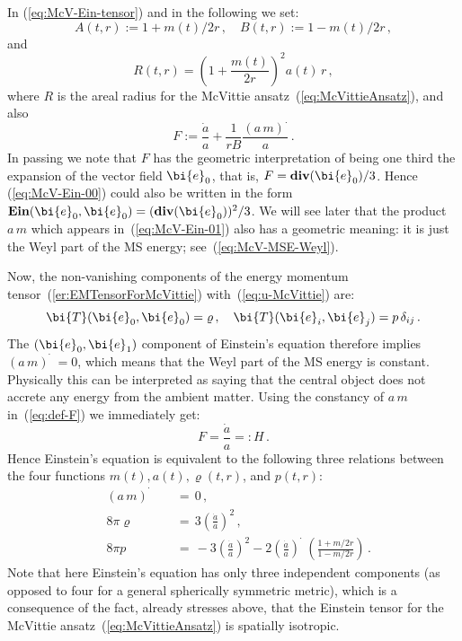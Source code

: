 \documentclass
[rmp,aps,twocolumn,showpacs,preprintnumbers,amsmath,amssymb]{revtex4}
\theoremstyle{plain}
\theoremstyle{definition}
\theoremstyle{remark}
\newcommand{\br}[1]{\mathbf{#1}}              %
\DeclareMathOperator{\Div}{\br{div}}          %
\DeclareMathOperator{\Ein}{\br{Ein}}          %
\newcommand{\bdot}{\boldsymbol{\cdot}}
\newcommand{\be}{\bi{e}}
\newcommand{\bT}{\bi{T}}
\begin{document}
In (\ref{eq:McV-Ein-tensor}) and in the following we set: 
%
\begin{equation}\label{eq:def-AB}
  A(t,r) := 1+m(t)/2r \,, \quad{  } B(t,r) := 1-m(t)/2r \,,
\end{equation}
%
and
%
\begin{equation}\label{eq:McVittieArealRadius}
  R(t,r)=\left( 1+\frac{m(t)}{2r} \right)^2 a(t)\,r \,,
\end{equation}
%
where $R$ is the areal radius for the McVittie 
ansatz~(\ref{eq:McVittieAnsatz}), and also
%
\begin{equation}\label{eq:def-F}
  F := \frac{\dot a}{a} + \frac{1}{rB}\frac{(a\,m)^{\bdot}}{a} \,.
\end{equation}
%
In passing we note that $F$ has the geometric interpretation of being 
one third the expansion of the vector field $\be_0$, that is, 
$F=\Div(\be_0)/3$. Hence (\ref{eq:McV-Ein-00}) could also be written 
in the form $\Ein(\be_0,\be_0)=(\Div(\be_0))^2/3$. We will see later 
that the product $a\,m$ which appears in~(\ref{eq:McV-Ein-01}) also 
has a geometric meaning: it is just the Weyl part of the MS energy; 
see~(\ref{eq:McV-MSE-Weyl}).

Now, the non-vanishing components of the energy momentum 
tensor~(\ref{er:EMTensorForMcVittie}) with~(\ref{eq:u-McVittie}) are:
%
\begin{equation}\label{eq:T-e0-components}
  \bT(\be_0,\be_0) = \varrho \,, \quad 
  \bT(\be_i,\be_j) = p\,\delta_{ij}\,. 
\end{equation}
%
The $(\be_0,\be_1)$ component of Einstein's equation therefore implies 
$(a\,m)\!\dot{\phantom{I}}\! = 0$, which means that the Weyl part of 
the MS energy is constant. Physically this can be interpreted as 
saying that the central object does not accrete any energy from 
the ambient matter. Using the constancy of $a\,m$ in~(\ref{eq:def-F}) 
we immediately get: 
%
\begin{equation}\label{eq:F-McVittie}
  F = \frac{\dot a}{a} =: H \,.
\end{equation}
%
Hence Einstein's equation is equivalent to the following three 
relations between the four functions $m(t), a(t), \varrho(t,r)$, 
and $p(t,r)$:
%
\begin{subequations}\label{eq:McV-Einstein}
\begin{alignat}{2}
\label{eq:McV-Einstein-1}
  &(a \, m)\!\dot{\phantom{I}}\! &&\,=\, 0 \,,\\
\label{eq:McV-Einstein-2}
  &8\pi \varrho    &&\,=\, 3 \left( \frac{\dot a}{a} \right)^2 \,,\\
\label{eq:McV-Einstein-3}
  &8\pi p          &&\,=\, - 3 \left( \frac{\dot a}{a} \right)^2
  - 2 \left( \frac{\dot{a}}{a} \right) \!\!\!\!\dot{\phantom{\frac{I}{I}}}
  \left( \frac{1+m/2r}{1-m/2r} \right) \,.
\end{alignat}
\end{subequations}
%
Note that here Einstein's equation has only three independent 
components (as opposed to four for a general spherically 
symmetric metric), which is a consequence of the fact, 
already stresses above, that the Einstein tensor for the McVittie 
ansatz~(\ref{eq:McVittieAnsatz}) is spatially isotropic. 
\end{document}
